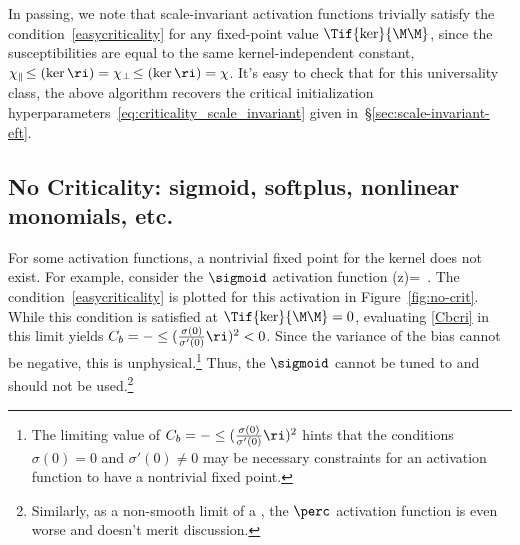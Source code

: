 In passing, we note that scale-invariant activation functions trivially satisfy the condition~\eqref{easycriticality} for any fixed-point value $\Tif{\ker}{\M\M}$, since the susceptibilities are equal to the same kernel-independent constant, $\chi_{\parallel}\!\le(\ker\ri)=\chi_{\perp}\!\le(\ker\ri)=\chi$. It's easy to check that for this universality class, the above algorithm recovers the critical initialization hyperparameters~\eqref{eq:criticality_scale_invariant} given in~\S\ref{sec:scale-invariant-eft}.




\subsection{No Criticality: sigmoid, softplus, nonlinear monomials, etc.}\label{subsec:no_thinking_no_money}
For some activation functions, a nontrivial fixed point for the kernel does not exist. For example, consider the $\sigmoid$ activation function
\be
\sigma(z)=\, .
\ee
The condition~\eqref{easycriticality} is plotted for this activation in Figure~\ref{fig:no-crit}. While this condition is satisfied at  $\Tif{\ker}{\M\M}=0$, evaluating \eqref{Cbcri} in this limit yields $C_b=-\le(\frac{\sigma(0)}{\sigma'(0)}\ri)^2<0$. Since the variance of the bias cannot be negative, this is unphysical.\footnote{The limiting value of $C_b=-\le(\frac{\sigma(0)}{\sigma'(0)}\ri)^2$ hints that the conditions $\sigma(0)=0$ and $\sigma'(0) \neq 0$ may be necessary constraints for an activation function to have a nontrivial fixed point.}
Thus, the $\sigmoid$ cannot be tuned to  and should not be used.\footnote{Similarly, as a non-smooth limit of a , the $\perc$ activation function is even worse and doesn't merit discussion.}
